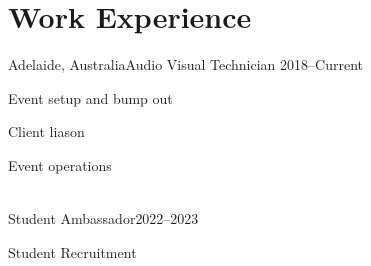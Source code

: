 \section{Work Experience}
	{Adelaide, Australia}{Audio Visual Technician}
	{2018--Current}{
    \item[\textbf{--}] Event setup and bump out
    \item[\textbf{--}] Client liason
    \item[\textbf{--}] Event operations
}\vspace{0.1cm}
\\
	{Student Ambassador}{2022--2023}
	{
    \item[\textbf{--}] Student Recruitment
	}

